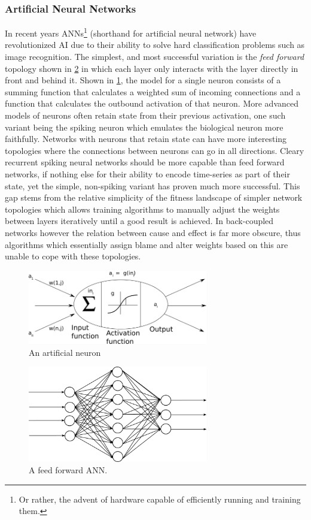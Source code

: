 \subsubsection{Artificial Neural Networks}
In recent years ANNs\footnote{Or rather, the advent of hardware capable of
  efficiently running and training them.} (shorthand for artificial neural
network) have revolutionized AI due to their ability to solve hard
classification problems such as image recognition.
The simplest, and most successful variation is the \emph{feed forward} topology
shown in \ref{figFFANN} in which each layer only interacts with the layer
directly in front and behind it.
Shown in \ref{figNeuronModel}, the model for a single neuron consists of a
summing function that calculates a weighted sum of incoming connections and a
function that calculates the outbound activation of that neuron.
More advanced models of neurons often retain state from their previous
activation, one such variant being the spiking neuron which emulates the
biological neuron more faithfully.
Networks with neurons that retain state can have more interesting topologies
where the connections between neurons can go in all directions.
Cleary recurrent spiking neural networks should be more capable than feed
forward networks, if nothing else for their ability to encode time-series as
part of their state, yet the simple, non-spiking variant has proven much more
successful.
This gap stems from the relative simplicity of the fitness landscape of simpler
network topologies which allows training algorithms to manually adjust the
weights between layers iteratively until a good result is achieved.
In back-coupled networks however the relation between cause and effect is far
more obscure, thus algorithms which essentially assign blame and alter weights
based on this are unable to cope with these topologies.
\begin{figure}[h!]
  \centering
  \includegraphics[width=0.7\textwidth]{fig/ArtificialNeuron.png}
  \caption{An artificial neuron}
  \label{figNeuronModel}
\end{figure}
\begin{figure}[h!]
  \centering
  \includegraphics[width=0.7\textwidth]{fig/feedforward.png}
  \caption{A feed forward ANN.}
  \label{figFFANN}
\end{figure}

